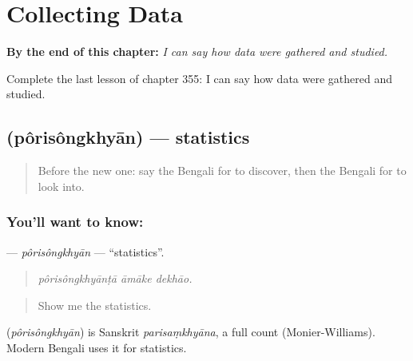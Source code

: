 
\chapter{Collecting Data}
\label{ch:bn-collecting-data}

\begin{chapteropening}
\textbf{By the end of this chapter:} \emph{I can say how data were gathered and studied.}

Complete the last lesson of chapter 355: I can say how data were gathered and studied.
\end{chapteropening}

\section[\texorpdfstring{\bn{পরিসংখ্যান} (pôrisôngkhyān)}{পরিসংখ্যান (pôrisôngkhyān)}]{ (pôrisôngkhyān) — statistics}

\label{lesson:BN-C355-porisongkhyan}



\begin{quote}
Before the new one: say the Bengali for to discover, then the Bengali for to look into.
\end{quote}

\subsection*{You'll want to know: }
\textbf{} — \emph{pôrisôngkhyān} — \textquotedblleft{}statistics\textquotedblright{}.

\begin{quote}
  
\end{quote}

\begin{quote}
\emph{pôrisôngkhyānṭā āmāke dekhāo.}
\end{quote}

\begin{quote}
Show me the statistics.
\end{quote}

\begin{cousinweb}
\textbf{} (\emph{pôrisôngkhyān}) is Sanskrit \emph{parisaṃkhyāna}, a full count (Monier-Williams). Modern Bengali uses it for statistics.
\end{cousinweb}

